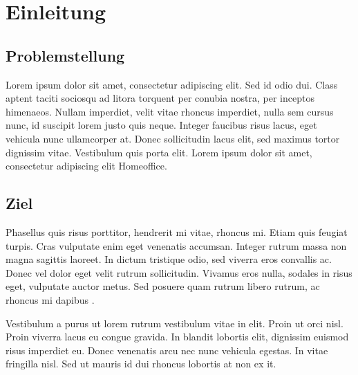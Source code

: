 \section{Einleitung}

\subsection{Problemstellung}
Lorem ipsum dolor sit amet, consectetur adipiscing elit. Sed id odio dui. Class aptent taciti sociosqu ad litora torquent per conubia nostra, per inceptos himenaeos. Nullam imperdiet, velit vitae rhoncus imperdiet, nulla sem cursus nunc, id suscipit lorem justo quis neque. Integer faucibus risus lacus, eget vehicula nunc ullamcorper at. Donec sollicitudin lacus elit, sed maximus tortor dignissim vitae. Vestibulum quis porta elit. Lorem ipsum dolor sit amet, consectetur adipiscing elit \gls{Homeoffice}.

\subsection{Ziel}
Phasellus quis risus porttitor, hendrerit mi vitae, rhoncus mi. Etiam quis feugiat turpis. Cras vulputate enim eget venenatis accumsan. Integer rutrum massa non magna sagittis laoreet. In dictum tristique odio, sed viverra eros convallis ac. Donec vel dolor eget velit rutrum sollicitudin. Vivamus eros nulla, sodales in risus eget, vulputate auctor metus. Sed posuere quam rutrum libero rutrum, ac rhoncus mi dapibus \autocite[][18-19]{seinscheHomeofficeUndPraesenzkultur2020a}.\par
Vestibulum a purus ut lorem rutrum vestibulum vitae in elit. Proin ut orci nisl. Proin viverra lacus eu congue gravida. In blandit lobortis elit, dignissim euismod risus imperdiet eu. Donec venenatis arcu nec nunc vehicula egestas. In vitae fringilla nisl. Sed ut mauris id dui rhoncus lobortis at non ex \ac{it}.
